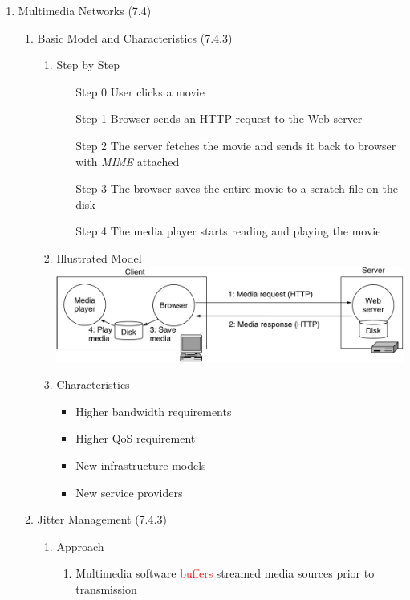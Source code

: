 \documentclass[a4paper,10pt]{article}
\newcommand{\red}[1]{\textcolor{red}{#1}}
\begin{document}
\begin{enumerate}
  \item Multimedia Networks (7.4)
    \begin{enumerate}
      \item Basic Model and Characteristics (7.4.3)
        \begin{enumerate}
          \item Step by Step
            \begin{itemize}
              \item [Step 0] User clicks a movie
              \item [Step 1] Browser sends an HTTP request to the Web server
              \item [Step 2] The server fetches the movie and sends it back to browser with \textit{MIME} attached
              \item [Step 3] The browser saves the entire movie to a scratch file on the disk
              \item [Step 4] The media player starts reading and playing the movie
            \end{itemize}
          \item Illustrated Model
            \newline\includegraphics[width=\textwidth]{media}
          \item Characteristics
            \begin{itemize}
              \item Higher bandwidth requirements
              \item Higher QoS requirement
              \item New infrastructure models
              \item New service providers
            \end{itemize}
        \end{enumerate}
      \item Jitter Management (7.4.3)
        \begin{enumerate}
          \item Approach
            \begin{enumerate}
              \item Multimedia software \red{buffers} streamed media sources prior to transmission

\end{enumerate}
\end{enumerate}
\end{enumerate}
\end{enumerate}
\end{document}
